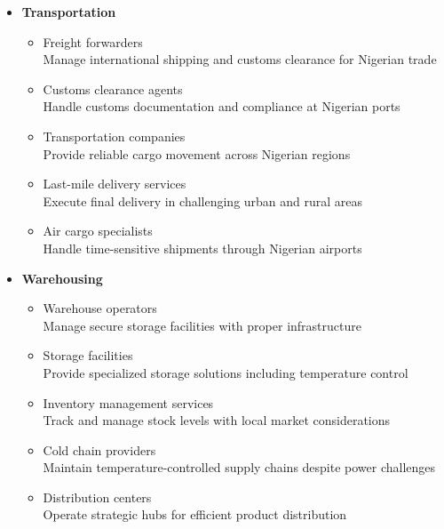 \begin{tcolorbox}[
    colback=white,
    colframe=primarydark,
    title=\textbf{Logistics Service Providers},
    before skip=1em,
    after skip=1em
]
    \begin{itemize}[leftmargin=*,itemsep=0.5em]
        \item \textbf{Transportation}
        \begin{itemize}[itemsep=0.3em]
            \item Freight forwarders \\
                \small{Manage international shipping and customs clearance for Nigerian trade}
            \item Customs clearance agents \\
                \small{Handle customs documentation and compliance at Nigerian ports}
            \item Transportation companies \\
                \small{Provide reliable cargo movement across Nigerian regions}
            \item Last-mile delivery services \\
                \small{Execute final delivery in challenging urban and rural areas}
            \item Air cargo specialists \\
                \small{Handle time-sensitive shipments through Nigerian airports}
        \end{itemize}

        \vspace{0.5em}

        \item \textbf{Warehousing}
        \begin{itemize}[itemsep=0.3em]
            \item Warehouse operators \\
                \small{Manage secure storage facilities with proper infrastructure}
            \item Storage facilities \\
                \small{Provide specialized storage solutions including temperature control}
            \item Inventory management services \\
                \small{Track and manage stock levels with local market considerations}
            \item Cold chain providers \\
                \small{Maintain temperature-controlled supply chains despite power challenges}
            \item Distribution centers \\
                \small{Operate strategic hubs for efficient product distribution}
        \end{itemize}


\end{itemize}
\end{tcolorbox}
